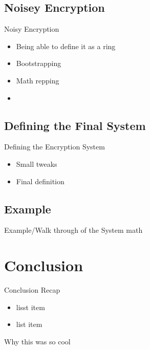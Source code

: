 \documentclass{beamer}
\begin{document}
\subsection{Noisey Encryption} %

\begin{frame}{Noisy Encryption}
    \begin{itemize}
    \item Being able to define it as a ring
    \item Bootstrapping
    \item Math repping 
    \item 
    \end{itemize}
\end{frame}

\subsection{Defining the Final System} %
\begin{frame}{Defining the Encryption System}
    \begin{itemize}
    \item Small tweaks
    \item Final definition
    \end{itemize}
\end{frame}

\subsection{Example}
\begin{frame}{Example/Walk through of the System}
math
\end{frame}

\section{Conclusion} 
\begin{frame}{Conclusion} %
    Recap
    \begin{itemize}
    \item lisst item
    \item list item
    \end{itemize}

    Why this was so cool
\end{frame}
\end{document}
